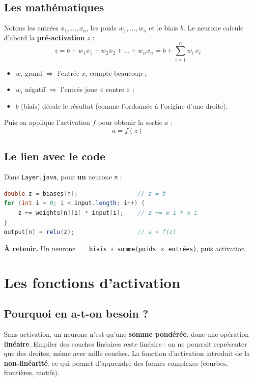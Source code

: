 \documentclass[11pt]{article}
\begin{document}
\subsection{Les mathématiques}
Notons les entrées $x_1,\dots,x_n$, les poids $w_1,\dots,w_n$ et le biais $b$.
Le neurone calcule d'abord la \textbf{pré-activation} $z$ :
\[
z = b + w_1 x_1 + w_2 x_2 + \dots + w_n x_n = b + \sum_{i=1}^{n} w_i\,x_i
\]
\begin{itemize}[leftmargin=2em]
  \item $w_i$ grand $\Rightarrow$ l'entrée $x_i$ compte beaucoup ;
  \item $w_i$ négatif $\Rightarrow$ l'entrée joue « contre » ;
  \item $b$ (biais) décale le résultat (comme l'ordonnée à l'origine d'une droite).
\end{itemize}
Puis on applique l'activation $f$ pour obtenir la sortie $a$ :
\[
a = f(z)
\]

\subsection{Le lien avec le code}
Dans \texttt{Layer.java}, pour \textbf{un} neurone \texttt{n} :
\begin{lstlisting}[language=Java]
double z = biases[n];                 // z = b
for (int i = 0; i < input.length; i++) {
    z += weights[n][i] * input[i];    // z += w_i * x_i
}
output[n] = relu(z);                  // a = f(z)
\end{lstlisting}

\begin{retenir}
\textbf{À retenir.} Un neurone $=$ \texttt{biais + somme(poids $\times$ entrées)},
puis activation.
\end{retenir}

\section{Les fonctions d'activation}

\subsection{Pourquoi en a-t-on besoin ?}
Sans activation, un neurone n'est qu'une \textbf{somme pondérée}, donc une
opération \textbf{linéaire}. Empiler des couches linéaires reste linéaire : on ne
pourrait représenter que des droites, même avec mille couches. La fonction
d'activation introduit de la \textbf{non-linéarité}, ce qui permet d'apprendre des
formes complexes (courbes, frontières, motifs).
\end{document}
